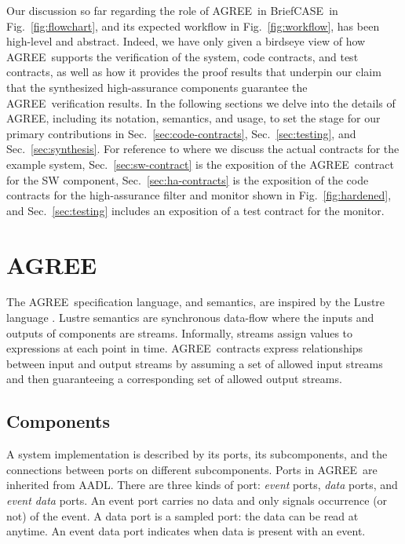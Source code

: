 \documentclass[global,twocolumn]{svjour}
\newcommand{\konst}[1]{\ensuremath{\mathsf{#1}}}
\newcommand{\figref}[1]{Fig.~\ref{#1}}
\newcommand{\secref}[1]{Sec.~\ref{#1}}
\newcommand{\brfcs}{BriefCASE}
\newcommand{\agr}{AGREE}
\begin{document}
Our discussion so far regarding the role of \agr\ in \brfcs\ in \figref{fig:flowchart}, and its expected workflow in \figref{fig:workflow}, has been high-level and abstract.
%
Indeed, we have only given a birdseye view of how \agr\ supports the verification of the system, code contracts, and test contracts, as well as how it provides the proof results that underpin our claim that the synthesized high-assurance components guarantee the \agr\ verification results.
%
In the following sections we delve into the details of \agr, including its notation, semantics, and usage, to set the stage for our primary contributions in \secref{sec:code-contracts}, \secref{sec:testing}, and \secref{sec:synthesis}.
%
For reference to where we discuss the actual contracts for the example system, \secref{sec:sw-contract} is the exposition of the \agr\ contract for the SW component, \secref{sec:ha-contracts} is the exposition of the code contracts for the high-assurance filter and monitor shown in \figref{fig:hardened}, and \secref{sec:testing} includes an exposition of a test contract for the monitor.


\section{\agr}
\label{sec:agree}

\newcommand{\globally}{\konst{Always}}
\newcommand{\historically}{\konst{Hist}}
\newcommand{\assumes}{\ensuremath{A}}
\newcommand{\guarantees}{\ensuremath{P}}
\newcommand{\inputs}{\ensuremath{I}}
\newcommand{\outputs}{\ensuremath{O}}
\newcommand{\components}{\ensuremath{C}}
\newcommand{\component}{\ensuremath{c}}

The \agr\ specification language, and semantics, are inspired by the Lustre language \cite{10.1145/41625.41641}.
%
Lustre semantics are synchronous data-flow where the inputs and outputs of components are streams.
%
Informally, streams assign values to expressions at each point in time.
%
\agr\ contracts express relationships between input and output streams by assuming a set of allowed input streams and then guaranteeing a corresponding set of allowed output streams.


\subsection{Components}

A system implementation is described by its ports, its subcomponents, and the connections between ports on different subcomponents.
%
Ports in \agr\ are inherited from AADL.
%
There are three kinds of port: \emph{event} ports, \emph{data} ports, and \emph{event data} ports.
%
An event port carries no data and only signals occurrence (or not) of the event.
%
A data port is a sampled port: the data can be read at anytime.
%
An event data port indicates when data is present with an event.
\end{document}
